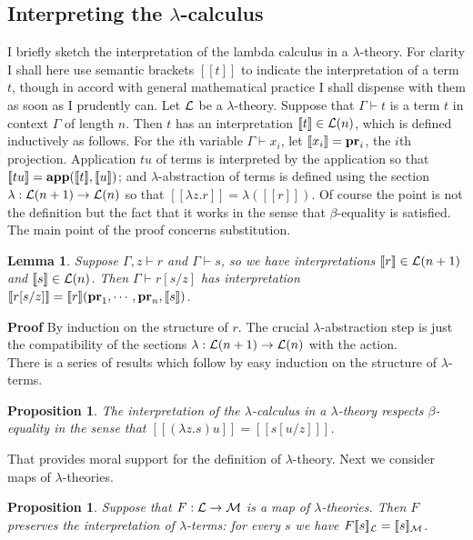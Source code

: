 \documentclass[12pt, amstex, amssymb]{article}
\newtheorem{proposition}[theorem]{Proposition}
\newtheorem{lemma}[theorem]{Lemma}
\newcommand{\lscott}{[\![}
\newcommand{\rscott}{]\!]}
\newcommand{\mcat}{\cal}
\begin{document}
\subsection{Interpreting the $\lambda$-calculus}
I briefly sketch the interpretation of the lambda calculus 
in a $\lambda$-theory.
For clarity I shall here use semantic brackets $\lscott t \rscott$
to indicate the interpretation of a term $t$, though in accord with general
mathematical practice I shall dispense with them as soon as I prudently can.
Let $\mcat L$ be a $\lambda$-theory. Suppose that $\Gamma \vdash t$
is a term $t$ in context $\Gamma$ of length $n$. Then $t$ has an interpretation
$\lscott t \rscott \in {\mcat L}(n)$, which is defined inductively as follows.
For the $i$th variable 
$\Gamma \vdash x_i$, let $\lscott x_i \rscott = {\bf pr}_i$,
the $i$th projection. Application $tu$ of terms is interpreted by
the application so that 
$\lscott tu \rscott = {\bf app}(\lscott t \rscott, \lscott u \rscott )$;
and $\lambda$-abstraction of terms is defined using the section
$\lambda : {\mcat L}(n+1) \to {\mcat L}(n)$
so that $\lscott \lambda z.r \rscott
= \lambda(\lscott r \rscott)$.
Of course the point is not the definition but the 
fact that it works in the
sense that  $\beta$-equality is satisfied. 
The main point of the proof concerns substitution.
\begin{lemma} Suppose $\Gamma, z \vdash r$ and $\Gamma \vdash s$, so
we have interpretations $\lscott r \rscott \in {\mcat L}(n+1)$
and $\lscott s \rscott \in {\mcat L}(n)$. Then
$\Gamma \vdash r[s/z]$ has interpretation
$\lscott r[s/z] \rscott = 
\lscott r \rscott ({\bf pr}_1 , \cdots , {\bf pr}_n, \lscott s \rscott)$.
\end{lemma}
{\bf Proof}
By induction on the structure of $r$. The crucial $\lambda$-abstraction step
is just the compatibility of the sections 
$\lambda : {\mcat L}(n+1) \to {\mcat L}(n)$ with
the action.\\[0.4em]
There is a series of results which follow by easy
induction on the structure of $\lambda$-terms.
\begin{proposition}
The interpretation of the $\lambda$-calculus in a $\lambda$-theory
respects $\beta$-equality in the sense that 
$\lscott (\lambda z. s)u \rscott = \lscott s[u/z] \rscott$.
\end{proposition}
That provides moral support for the definition of $\lambda$-theory.
Next we consider maps of $\lambda$-theories.
\begin{proposition}
Suppose that $F: {\mcat L} \to {\mcat M}$ is a map of $\lambda$-theories.
Then $F$ preserves the interpretation of $\lambda$-terms:
for every $s$ we have 
$F\lscott s \rscott_{\mcat L} = \lscott s \rscott_{\mcat M}$.
\end{proposition}
\end{document}
